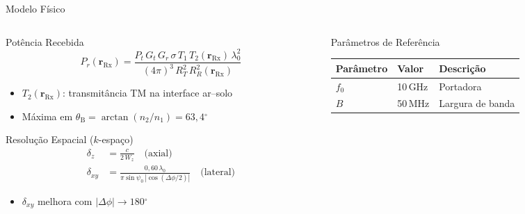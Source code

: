 \documentclass[aspectratio=169, 10pt]{beamer}
\newcommand{\Rx}{\mathrm{Rx}}
\newcommand{\rRx}{\mathbf{r}_{\Rx}}
\newcommand{\dxy}{\delta_{xy}}
\newcommand{\dz}{\delta_z}
\newcommand{\thetaB}{\theta_{\mathrm{B}}}
\newcommand{\gdeg}{\ensuremath{^{\circ}}}
\begin{document}
\begin{frame}{Modelo Físico}
  \begin{columns}[T]
    \begin{column}{0.48\textwidth}
      \begin{block}{Potência Recebida}
        \vspace{-0.4em}
        \begin{equation*}
          P_r(\rRx) =
          \frac{P_t\,G_t\,G_r\,\sigma\,T_1\,T_2(\rRx)\,\lambda_0^2}
               {(4\pi)^3\,R_T^2\,R_R^2(\rRx)}
        \end{equation*}
        \vspace{-0.3em}
        \begin{itemize}
          \item $T_2(\rRx)$: transmitância TM na interface ar--solo
          \item Máxima em $\thetaB = \arctan(n_2/n_1) = 63{,}4\gdeg$
        \end{itemize}
      \end{block}
      \vspace{0.5em}
      \begin{block}{Resolução Espacial ($k$-espaço)}
        \vspace{-0.4em}
        \begin{align*}
          \dz  &= \frac{c}{2\,W_z}
                \quad\text{(axial)} \\[4pt]
          \dxy &= \frac{0{,}60\,\lambda_0}
                       {\pi\sin\psi_0\,|\cos(\Delta\phi/2)|}
                \quad\text{(lateral)}
        \end{align*}
        \vspace{-0.3em}
        \begin{itemize}
          \item $\dxy$ melhora com $|\Delta\phi| \to 180\gdeg$
        \end{itemize}
      \end{block}
    \end{column}
    \begin{column}{0.48\textwidth}
      \begin{block}{Parâmetros de Referência}
        \centering
        \renewcommand{\arraystretch}{1.15}
        \begin{tabular}{@{}lll@{}}
          \toprule
          Parâmetro & Valor & Descrição \\
          \midrule
          $f_0$        & 10\,GHz  & Portadora \\
          $B$          & 50\,MHz  & Largura de banda \\

\end{tabular}
\end{block}
\end{column}
\end{columns}
\end{frame}
\end{document}

